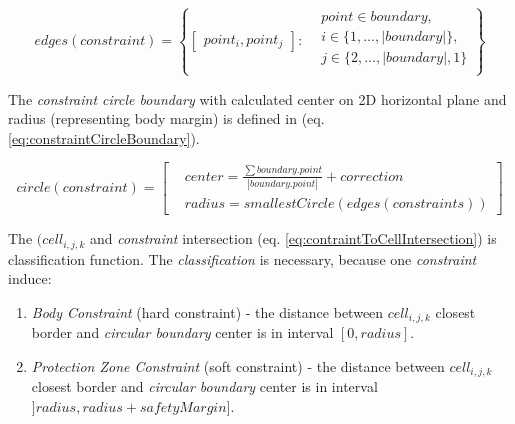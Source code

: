 \begin{equation}\label{eq:constraintEdgeSet}
    edges(constraint) =
    \left\{
    \begin{bmatrix}
        point_{i},point_{j}
    \end{bmatrix}:
    \begin{aligned}
    &point\in boundary,\\
    &i \in \{1,\dots,|boundary|\},\\
    &j \in \{2,\dots, |boundary|,1\}\\
    \end{aligned}
    \right\}
\end{equation}

\noindent The \emph{constraint circle boundary} with calculated center on 2D horizontal plane and radius (representing body margin) is defined in (eq. \ref{eq:constraintCircleBoundary}).

\begin{equation}\label{eq:constraintCircleBoundary}
    circle(constraint)=
    \left[
        \begin{aligned}
            & center = \frac{\sum boundary.point}{|boundary.point|} + correction\\
            & radius = smallest Circle(edges(constraints)) 
        \end{aligned}
    \right]
\end{equation}

\noindent The $(cell_{i,j,k}$ and \emph{constraint} intersection (eq. \ref{eq:contraintToCellIntersection}) is classification function. The \emph{classification} is necessary, because one \emph{constraint} induce: 
\begin{enumerate}
    \item \emph{Body Constraint} (hard constraint) - the distance between $cell_{i,j,k}$ closest border and \emph{circular boundary} center is in interval $[0,radius]$.
    
    \item \emph{Protection Zone Constraint} (soft constraint) - the distance between $cell_{i,j,k}$ closest border and \emph{circular boundary} center is in interval $]radius,radius+safety Margin]$.
\end{enumerate}


